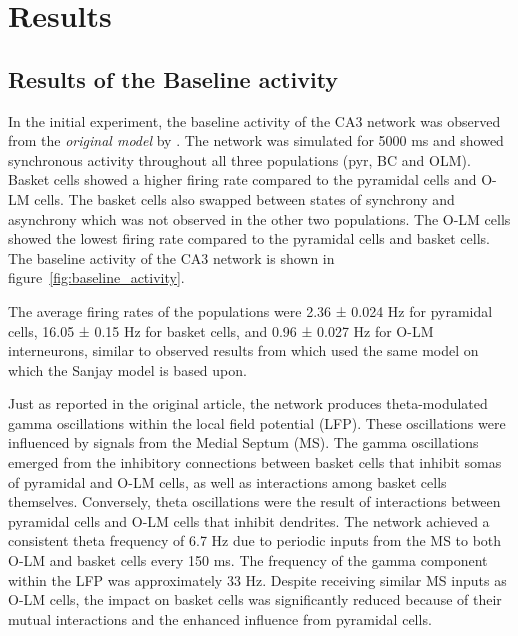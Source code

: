 \chapter{Results}


\section{Results of the Baseline activity}
In the initial experiment, the baseline activity of the CA3 network was
observed from the \textit{original model} by
\textcite{sanjayImpairedDendriticInhibition2015}. The network was simulated for
5000 ms and showed synchronous activity throughout all three
populations (pyr, BC and OLM). Basket cells showed a higher firing rate
compared to the pyramidal cells and O-LM cells. The basket cells also swapped
between states of synchrony and asynchrony which was not observed in the other
two populations. The O-LM cells showed the lowest firing rate compared to the
pyramidal cells and basket cells. The baseline activity of the CA3 network is
shown in figure~\ref{fig:baseline_activity}.

The average firing rates of the populations were 2.36 ± 0.024 Hz for pyramidal cells, 
16.05 ± 0.15 Hz for basket cells, and 0.96 ± 0.027 Hz for O-LM interneurons, 
similar to observed results from \textcite{neymotinKetamineDisruptsTheta2011} which used the same model on which the Sanjay model is based upon.

Just as reported in the original article, the network produces theta-modulated gamma oscillations 
within the local field potential (LFP). These oscillations were influenced by signals from the Medial Septum (MS). 
The gamma oscillations emerged from the inhibitory connections between basket cells that inhibit somas of pyramidal and O-LM cells, 
as well as interactions among basket cells themselves. Conversely, theta oscillations were the result of interactions between 
pyramidal cells and O-LM cells that inhibit dendrites. The network achieved a consistent theta frequency of 6.7 Hz due to periodic inputs 
from the MS to both O-LM and basket cells every 150 ms. The frequency of the gamma component within the LFP was approximately 33 Hz. 
Despite receiving similar MS inputs as O-LM cells, the impact on basket cells was significantly reduced because of their mutual interactions 
and the enhanced influence from pyramidal cells.

